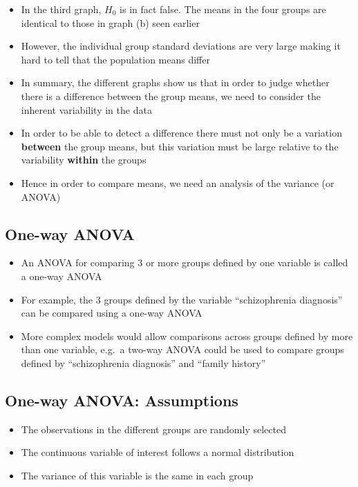 \documentclass[
]{book}
\providecommand{\tightlist}{%
  \setlength{\itemsep}{0pt}\setlength{\parskip}{0pt}}
\begin{document}
\begin{itemize}
\tightlist
\item
  In the third graph, \(H_0\) is in fact false. The means in the four groups are identical to those in graph (b) seen earlier
\item
  However, the individual group standard deviations are very large making it hard to tell that the population means differ
\item
  In summary, the different graphs show us that in order to judge whether there is a difference between the group means, we need to consider the inherent variability in the data
\item
  In order to be able to detect a difference there must not only be a variation \textbf{between} the group means, but this variation must be large relative to the variability \textbf{within} the groups
\item
  Hence in order to compare means, we need an analysis of the variance (or ANOVA)
\end{itemize}

\hypertarget{one-way-anova}{%
\subsection{One-way ANOVA}\label{one-way-anova}}

\begin{itemize}
\tightlist
\item
  An ANOVA for comparing 3 or more groups defined by one variable is called a one-way ANOVA
\item
  For example, the 3 groups defined by the variable ``schizophrenia diagnosis'' can be compared using a one-way ANOVA
\item
  More complex models would allow comparisons across groups defined by more than one variable, e.g.~a two-way ANOVA could be used to compare groups defined by ``schizophrenia diagnosis'' and ``family history''
\end{itemize}

\hypertarget{one-way-anova-assumptions}{%
\subsection{One-way ANOVA: Assumptions}\label{one-way-anova-assumptions}}

\begin{itemize}
\tightlist
\item
  The observations in the different groups are randomly selected
\item
  The continuous variable of interest follows a normal distribution
\item
  The variance of this variable is the same in each group
\end{itemize}
\end{document}
